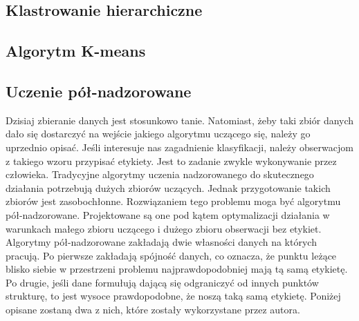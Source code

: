 \documentclass{article}
\begin{document}
\subsection{Klastrowanie hierarchiczne}

\subsection{Algorytm K-means}
\subsection{Uczenie pół-nadzorowane}
Dzisiaj zbieranie danych jest stosunkowo tanie.
Natomiast, żeby taki zbiór danych dało się dostarczyć na wejście jakiego algorytmu uczącego się, należy go uprzednio opisać.
Jeśli interesuje nas zagadnienie klasyfikacji, należy obserwacjom z takiego wzoru przypisać etykiety.
Jest to zadanie zwykle wykonywanie przez człowieka.
Tradycyjne algorytmy uczenia nadzorowanego do skutecznego działania potrzebują dużych zbiorów uczących. 
Jednak przygotowanie takich zbiorów jest zasobochłonne.
Rozwiązaniem tego problemu moga być algorytmu pół-nadzorowane.
Projektowane są one pod kątem optymalizacji działania w warunkach małego zbioru uczącego i dużego zbioru obserwacji bez etykiet.
Algorytmy pół-nadzorowane zakładają dwie własności danych na których pracują.
Po pierwsze zakładają spójność danych, co oznacza, że punktu leżące blisko siebie w przestrzeni problemu najprawdopodobniej mają tą samą etykietę.
Po drugie, jeśli dane formułują dającą się odgraniczyć od innych punktów strukturę, to jest wysoce prawdopodobne, że noszą taką samą etykietę\cite{Zhou2004}.
Poniżej opisane zostaną dwa z nich, które zostały wykorzystane przez autora.
\end{document}
